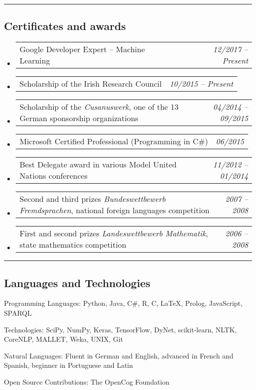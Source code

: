 \documentclass[10pt,letterpaper]{article}
\makeatletter
\newenvironment{indentsection}[1]%
{\begin{list}{}%
	{\setlength{\leftmargin}{#1}}%
	\item[]%
}
{\end{list}}
\newcommand{\headerrow}[2]
{\begin{tabular*}{\linewidth}{l@{\extracolsep{\fill}}r}
	#1 &
	#2 \\
\end{tabular*}}
\makeatother
\begin{document}
\hrule
\vspace{-0.4em}
\subsection*{Certificates and awards}

\begin{itemize}
	\parskip=0.1em
	
	\item 
	\headerrow
		{Google Developer Expert -- Machine Learning}
		{\emph{12/2017 -- Present}}
	\item 
	\headerrow
		{Scholarship of the Irish Research Council}
		{\emph{10/2015 -- Present}}
	\item 
	\headerrow
		{Scholarship of the \emph{Cusanuswerk}, one of the 13 German sponsorship organizations}
		{\emph{04/2014 -- 09/2015}}	
	\item 
	\headerrow
		{Microsoft Certified Professional (Programming in C\#)}
		{\emph{06/2015}}
	\item 
	\headerrow
		{Best Delegate award in various Model United Nations conferences}
		{\emph{11/2012 -- 01/2014}}
	\item 
	\headerrow
		{Second and third prizes \emph{Bundeswettbewerb Fremdsprachen}, national foreign languages competition}
		{\emph{2007 -- 2008}}
	\item 
	\headerrow
		{First and second prizes \emph{Landeswettbewerb Mathematik}, state mathematics competition}
		{\emph{2006 -- 2008}}
	

\end{itemize}

\hrule
\vspace{-0.4em}
\subsection*{Languages and Technologies}

\begin{indentsection}{\parindent}
\begin{description*}
	\item[Programming Languages:]
	Python, Java, C\#, R, C, \LaTeX, Prolog, JavaScript, SPARQL
	\item[Technologies:]
	SciPy, NumPy, Keras, TensorFlow, DyNet, scikit-learn, NLTK, CoreNLP, MALLET, Weka, UNIX, Git
	\item[Natural Languages:]
	Fluent in German and English, advanced in French and Spanish, beginner in Portuguese and Latin	
	\item[Open Source Contributions:]
	The OpenCog Foundation
\end{description*}
\end{indentsection}
\end{document}
